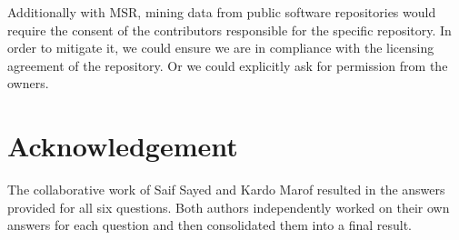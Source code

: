 \documentclass[conference]{IEEEtran}
\begin{document}
Additionally with MSR, mining data from public software repositories would require the consent of the contributors responsible for the specific repository. In order to mitigate it, we could ensure we are in compliance with the licensing agreement of the repository. Or we could explicitly ask for permission from the owners.

\section{Acknowledgement}
The collaborative work of Saif Sayed and Kardo Marof resulted in the answers provided for all six questions. Both authors independently worked on their own answers for each question and then consolidated them into a final result.
\end{document}
